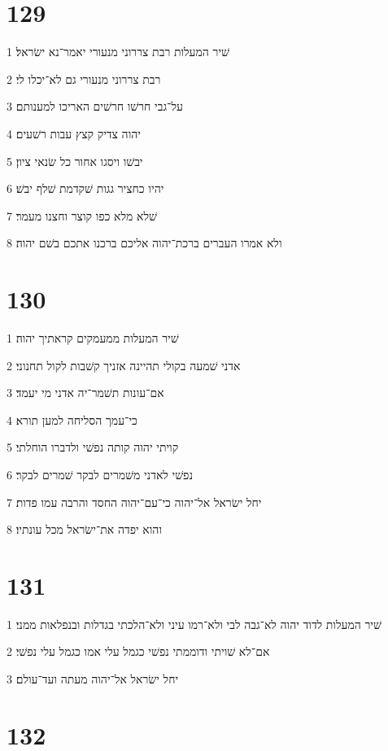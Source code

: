 \chapter{129}

\par 1 שׁיר המעלות רבת צררוני מנעורי יאמר־נא ישׂראל׃
\par 2 רבת צררוני מנעורי גם לא־יכלו לי׃
\par 3 על־גבי חרשׁו חרשׁים האריכו למענותם׃
\par 4 יהוה צדיק קצץ עבות רשׁעים׃
\par 5 יבשׁו ויסגו אחור כל שׂנאי ציון׃
\par 6 יהיו כחציר גגות שׁקדמת שׁלף יבשׁ׃
\par 7 שׁלא מלא כפו קוצר וחצנו מעמר׃
\par 8 ולא אמרו העברים ברכת־יהוה אליכם ברכנו אתכם בשׁם יהוה׃

\chapter{130}

\par 1 שׁיר המעלות ממעמקים קראתיך יהוה׃
\par 2 אדני שׁמעה בקולי תהיינה אזניך קשׁבות לקול תחנוני׃
\par 3 אם־עונות תשׁמר־יה אדני מי יעמד׃
\par 4 כי־עמך הסליחה למען תורא׃
\par 5 קויתי יהוה קותה נפשׁי ולדברו הוחלתי׃
\par 6 נפשׁי לאדני משׁמרים לבקר שׁמרים לבקר׃
\par 7 יחל ישׂראל אל־יהוה כי־עם־יהוה החסד והרבה עמו פדות׃
\par 8 והוא יפדה את־ישׂראל מכל עונתיו׃

\chapter{131}

\par 1 שׁיר המעלות לדוד יהוה לא־גבה לבי ולא־רמו עיני ולא־הלכתי בגדלות ובנפלאות ממני׃
\par 2 אם־לא שׁויתי ודוממתי נפשׁי כגמל עלי אמו כגמל עלי נפשׁי׃
\par 3 יחל ישׂראל אל־יהוה מעתה ועד־עולם׃

\chapter{132}

